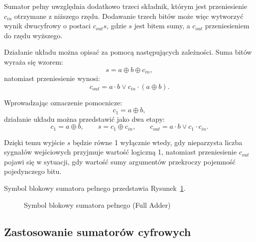 \documentclass[12pt,a4paper]{article}
\begin{document}
Sumator pełny uwzględnia dodatkowo trzeci składnik, którym jest przeniesienie $c_{in}$ otrzymane z niższego rzędu. Dodawanie trzech bitów może więc wytworzyć wynik dwucyfrowy o postaci $c_{out}s$, gdzie $s$ jest bitem sumy, a $c_{out}$ przeniesieniem do rzędu wyższego.

Działanie układu można opisać za pomocą następujących zależności. Suma bitów wyraża się wzorem:
\begin{equation*}
s = a \oplus b \oplus c_{in},
\end{equation*}
natomiast przeniesienie wynosi:
\begin{equation*}
c_{out} = a \cdot b \vee c_{in} \cdot (a \oplus b).
\end{equation*}

Wprowadzając oznaczenie pomocnicze:
\begin{equation*}
c_1 = a \oplus b,
\end{equation*}
działanie układu można przedstawić jako dwa etapy:
\begin{equation*}
c_1 = a \oplus b, \qquad s = c_1 \oplus c_{in}, \qquad c_{out} = a \cdot b \vee c_1 \cdot c_{in}.
\end{equation*}

Dzięki temu wyjście $s$ będzie równe 1 wyłącznie wtedy, gdy nieparzysta liczba sygnałów wejściowych przyjmuje wartość logiczną 1, natomiast przeniesienie $c_{out}$ pojawi się w sytuacji, gdy wartość sumy argumentów przekroczy pojemność pojedynczego bitu.

Symbol blokowy sumatora pełnego przedstawia Rysunek~\ref{fig:symbol-fa}.

\begin{figure}[h]
    \centering
    \caption{Symbol blokowy sumatora pełnego (Full Adder)}
    \label{fig:symbol-fa}
\end{figure}

\subsection{Zastosowanie sumatorów cyfrowych}
\end{document}
